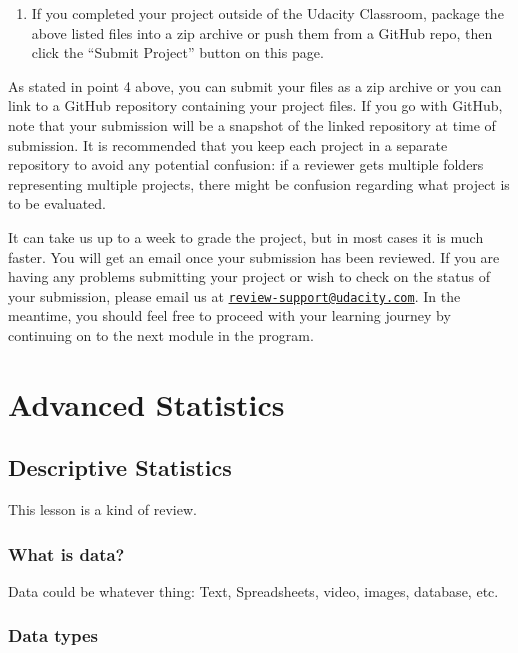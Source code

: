 \documentclass[]{book}
\providecommand{\tightlist}{%
  \setlength{\itemsep}{0pt}\setlength{\parskip}{0pt}}
\begin{document}
\begin{enumerate}
\def\labelenumi{\arabic{enumi}.}
\setcounter{enumi}{3}
\tightlist
\item
  If you completed your project outside of the Udacity Classroom,
  package the above listed files into a zip archive or push them from a
  GitHub repo, then click the ``Submit Project'' button on this page.
\end{enumerate}

As stated in point 4 above, you can submit your files as a zip archive
or you can link to a GitHub repository containing your project files. If
you go with GitHub, note that your submission will be a snapshot of the
linked repository at time of submission. It is recommended that you keep
each project in a separate repository to avoid any potential confusion:
if a reviewer gets multiple folders representing multiple projects,
there might be confusion regarding what project is to be evaluated.

It can take us up to a week to grade the project, but in most cases it
is much faster. You will get an email once your submission has been
reviewed. If you are having any problems submitting your project or wish
to check on the status of your submission, please email us at
\href{mailto:review-support@udacity.com}{\nolinkurl{review-support@udacity.com}}.
In the meantime, you should feel free to proceed with your learning
journey by continuing on to the next module in the program.

\chapter{Advanced Statistics}\label{advanced-statistics}

\section{Descriptive Statistics}\label{descriptive-statistics}

This lesson is a kind of review.

\subsection{What is data?}\label{what-is-data}

Data could be whatever thing: Text, Spreadsheets, video, images,
database, etc.

\subsection{Data types}\label{data-types}
\end{document}
